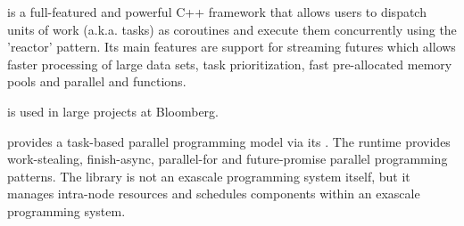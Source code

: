 \cite{bbquantum} is a full-featured and
powerful C++ framework that allows users to dispatch units of work (a.k.a.
tasks) as coroutines and execute them concurrently using the 'reactor' pattern.
Its main features are support for streaming futures which allows faster processing
of large data sets, task prioritization, fast pre-allocated memory pools and
parallel  and  functions.

\bbquantum\xspace is used in large projects at Bloomberg.

provides a task-based parallel programming model via its \hclib\cite{hclib}.
The runtime provides work-stealing, finish-async, parallel-for and
future-promise parallel programming patterns. The library is not an exascale
programming system itself, but it manages intra-node resources and schedules
components within an exascale programming system.

